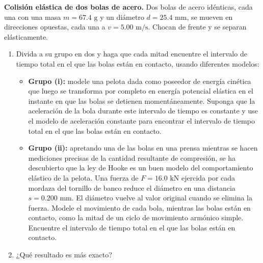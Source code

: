 \item \textbf{Colisión elástica de dos bolas de acero.}
Dos bolas de acero idénticas, cada una con una masa $m = 67.4\text{ g}$ y un diámetro $d = 25.4\text{ mm}$, se mueven en direcciones opuestas, cada una a $v = 5.00\text{ m/s}$. Chocan de frente y se separan elásticamente.
\begin{enumerate}
    \item Divida a su grupo en dos y haga que cada mitad encuentre el intervalo de tiempo total en el que las bolas están en contacto, usando diferentes modelos:
    \begin{itemize}
        \item \textbf{Grupo (i):} modele una pelota dada como poseedor de energía cinética que luego se transforma por completo en energía potencial elástica en el instante en que las bolas se detienen momentáneamente. Suponga que la aceleración de la bola durante este intervalo de tiempo es constante y use el modelo de aceleración constante para encontrar el intervalo de tiempo total en el que las bolas están en contacto.
        \item \textbf{Grupo (ii):} apretando una de las bolas en una prensa mientras se hacen mediciones precisas de la cantidad resultante de compresión, se ha descubierto que la ley de Hooke es un buen modelo del comportamiento elástico de la pelota. Una fuerza de $F = 16.0\text{ kN}$ ejercida por cada mordaza del tornillo de banco reduce el diámetro en una distancia $s = 0.200\text{ mm}$. El diámetro vuelve al valor original cuando se elimina la fuerza. Modele el movimiento de cada bola, mientras las bolas están en contacto, como la mitad de un ciclo de movimiento armónico simple. Encuentre el intervalo de tiempo total en el que las bolas están en contacto.
    \end{itemize}
    \item ¿Qué resultado es más exacto?
\end{enumerate}